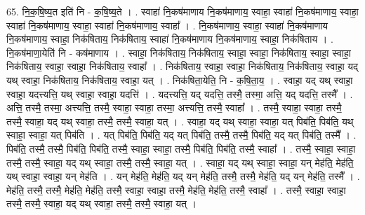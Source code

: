 \documentclass[17pt]{extarticle}
\begin{document}
65. नि॒क॒षि॒ष्य॒त इति॑ नि - क॒षि॒ष्य॒ते । . स्वाहा॑ नि॒कष॑माणाय नि॒कष॑माणाय॒ स्वाहा॒ स्वाहा॑ नि॒कष॑माणाय॒ स्वाहा॒ स्वाहा॑ नि॒कष॑माणाय॒ स्वाहा॒ स्वाहा॑ नि॒कष॑माणाय॒ स्वाहा᳚ । . नि॒कष॑माणाय॒ स्वाहा॒ स्वाहा॑ नि॒कष॑माणाय नि॒कष॑माणाय॒ स्वाहा॒ निक॑षिताय॒ निक॑षिताय॒ स्वाहा॑ नि॒कष॑माणाय नि॒कष॑माणाय॒ स्वाहा॒ निक॑षिताय । . नि॒कष॑माणा॒येति॑ नि - कष॑माणाय । . स्वाहा॒ निक॑षिताय॒ निक॑षिताय॒ स्वाहा॒ स्वाहा॒ निक॑षिताय॒ स्वाहा॒ स्वाहा॒ निक॑षिताय॒ स्वाहा॒ स्वाहा॒ निक॑षिताय॒ स्वाहा᳚ । . निक॑षिताय॒ स्वाहा॒ स्वाहा॒ निक॑षिताय॒ निक॑षिताय॒ स्वाहा॒ यद् यथ् स्वाहा॒ निक॑षिताय॒ निक॑षिताय॒ स्वाहा॒ यत् । . निक॑षिता॒येति॒ नि - क॒षि॒ता॒य॒ । . स्वाहा॒ यद् यथ् स्वाहा॒ स्वाहा॒ यदत्त्यत्ति॒ यथ् स्वाहा॒ स्वाहा॒ यदत्ति॑ । . यदत्त्यत्ति॒ यद् यदत्ति॒ तस्मै॒ तस्मा॒ अत्ति॒ यद् यदत्ति॒ तस्मै᳚ । . अत्ति॒ तस्मै॒ तस्मा॒ अत्त्यत्ति॒ तस्मै॒ स्वाहा॒ स्वाहा॒ तस्मा॒ अत्त्यत्ति॒ तस्मै॒ स्वाहा᳚ । . तस्मै॒ स्वाहा॒ स्वाहा॒ तस्मै॒ तस्मै॒ स्वाहा॒ यद् यथ् स्वाहा॒ तस्मै॒ तस्मै॒ स्वाहा॒ यत् । . स्वाहा॒ यद् यथ् स्वाहा॒ स्वाहा॒ यत् पिब॑ति॒ पिब॑ति॒ यथ् स्वाहा॒ स्वाहा॒ यत् पिब॑ति । . यत् पिब॑ति॒ पिब॑ति॒ यद् यत् पिब॑ति॒ तस्मै॒ तस्मै॒ पिब॑ति॒ यद् यत् पिब॑ति॒ तस्मै᳚ । . पिब॑ति॒ तस्मै॒ तस्मै॒ पिब॑ति॒ पिब॑ति॒ तस्मै॒ स्वाहा॒ स्वाहा॒ तस्मै॒ पिब॑ति॒ पिब॑ति॒ तस्मै॒ स्वाहा᳚ । . तस्मै॒ स्वाहा॒ स्वाहा॒ तस्मै॒ तस्मै॒ स्वाहा॒ यद् यथ् स्वाहा॒ तस्मै॒ तस्मै॒ स्वाहा॒ यत् । . स्वाहा॒ यद् यथ् स्वाहा॒ स्वाहा॒ यन् मेह॑ति॒ मेह॑ति॒ यथ् स्वाहा॒ स्वाहा॒ यन् मेह॑ति । . यन् मेह॑ति॒ मेह॑ति॒ यद् यन् मेह॑ति॒ तस्मै॒ तस्मै॒ मेह॑ति॒ यद् यन् मेह॑ति॒ तस्मै᳚ । . मेह॑ति॒ तस्मै॒ तस्मै॒ मेह॑ति॒ मेह॑ति॒ तस्मै॒ स्वाहा॒ स्वाहा॒ तस्मै॒ मेह॑ति॒ मेह॑ति॒ तस्मै॒ स्वाहा᳚ । . तस्मै॒ स्वाहा॒ स्वाहा॒ तस्मै॒ तस्मै॒ स्वाहा॒ यद् यथ् स्वाहा॒ तस्मै॒ तस्मै॒ स्वाहा॒ यत् । \newline
\end{document}
